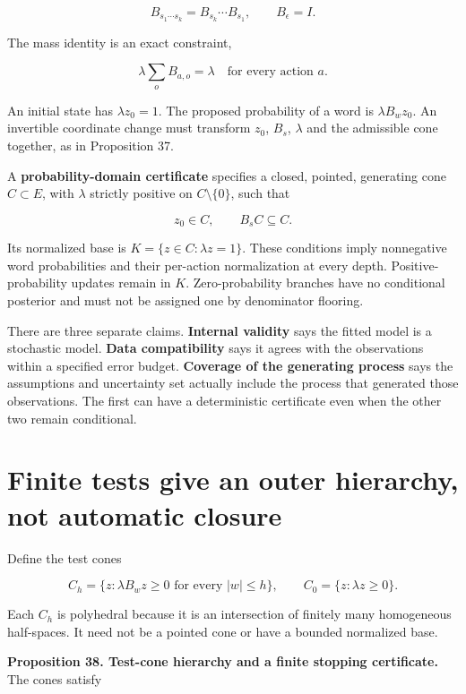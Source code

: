 \[
B_{s_1\cdots s_k}=B_{s_k}\cdots B_{s_1},\qquad B_\epsilon=I.
\]

The mass identity is an exact constraint,

\[
\lambda\sum_o B_{a,o}=\lambda \quad\text{for every action }a.
\]

An initial state has \(\lambda z_0=1\). The proposed probability of a
word is \(\lambda B_wz_0\). An invertible coordinate change must
transform \(z_0\), \(B_s\), \(\lambda\) and the admissible cone
together, as in Proposition 37.

A \textbf{probability-domain certificate} specifies a closed, pointed,
generating cone \(C\subset E\), with \(\lambda\) strictly positive on
\(C\setminus\{0\}\), such that

\[
z_0\in C,\qquad B_sC\subseteq C.
\]

Its normalized base is \(K=\{z\in C:\lambda z=1\}\). These conditions
imply nonnegative word probabilities and their per-action normalization
at every depth. Positive-probability updates remain in \(K\).
Zero-probability branches have no conditional posterior and must not be
assigned one by denominator flooring.

There are three separate claims. \textbf{Internal validity} says the
fitted model is a stochastic model. \textbf{Data compatibility} says it
agrees with the observations within a specified error budget.
\textbf{Coverage of the generating process} says the assumptions and
uncertainty set actually include the process that generated those
observations. The first can have a deterministic certificate even when
the other two remain conditional.

\section{Finite tests give an outer hierarchy, not automatic closure}\label{LSM:finite-tests-give-an-outer-hierarchy-not-automatic-closure}

Define the test cones

\[
C_h=\{z:\lambda B_wz\geq0\text{ for every }|w|\leq h\},
\qquad C_0=\{z:\lambda z\geq0\}.
\]

Each \(C_h\) is polyhedral because it is an intersection of finitely
many homogeneous half-spaces. It need not be a pointed cone or have a
bounded normalized base.

\textbf{Proposition 38. Test-cone hierarchy and a finite stopping
certificate.} The cones satisfy

